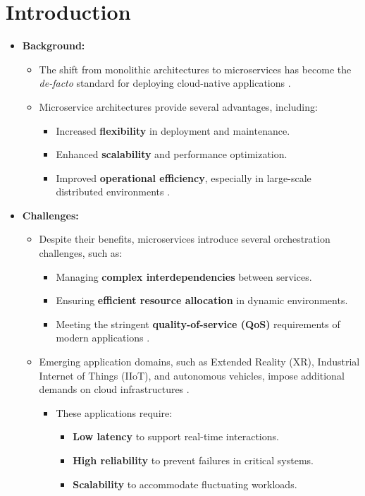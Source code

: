 \documentclass[conference]{IEEEtran}
\begin{document}
    \section{Introduction}
\begin{itemize}
    \item \textbf{Background:}
    \begin{itemize}
        \item The shift from monolithic architectures to microservices has become the \textit{de-facto} standard for deploying cloud-native applications \cite{dragoni2017microservices, larrucea2018microservices}.
        \item Microservice architectures provide several advantages, including:
        \begin{itemize}
            \item Increased \textbf{flexibility} in deployment and maintenance.
            \item Enhanced \textbf{scalability} and performance optimization.
            \item Improved \textbf{operational efficiency}, especially in large-scale distributed environments \cite{schneider2016connected}.
        \end{itemize}
    \end{itemize}

    \item \textbf{Challenges:}
    \begin{itemize}
        \item Despite their benefits, microservices introduce several orchestration challenges, such as:
        \begin{itemize}
            \item Managing \textbf{complex interdependencies} between services.
            \item Ensuring \textbf{efficient resource allocation} in dynamic environments.
            \item Meeting the stringent \textbf{quality-of-service (QoS)} requirements of modern applications \cite{qu2018autoscaling}.
        \end{itemize}
        \item Emerging application domains, such as Extended Reality (XR), Industrial Internet of Things (IIoT), and autonomous vehicles, impose additional demands on cloud infrastructures \cite{giordani2020toward, santos2021towards}.
        \begin{itemize}
            \item These applications require:
            \begin{itemize}
                \item \textbf{Low latency} to support real-time interactions.
                \item \textbf{High reliability} to prevent failures in critical systems.
                \item \textbf{Scalability} to accommodate fluctuating workloads.
            \end{itemize}
        \end{itemize}
    \end{itemize}


\end{itemize}
\end{document}

